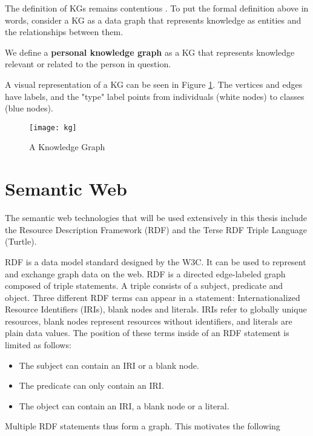 The definition of KGs remains contentious \cite{Hogan2021KG,commonsenseKG}. To put the formal definition above in words, consider a KG as a data graph that represents knowledge as entities and the relationships between them. 

We define a \textbf{personal knowledge graph} as a KG that represents knowledge relevant or related to the person in question.

A visual representation of a KG can be seen in Figure \ref{fig:kg}. The vertices and edges have labels, and the "type" label points from individuals (white nodes) to classes (blue nodes).

\begin{figure}[H]
    \centering
    \texttt{[image: kg]}
    \caption{A Knowledge Graph}
    \label{fig:kg}
\end{figure}







\section{Semantic Web}

The semantic web technologies that will be used extensively in this thesis include the Resource Description Framework (RDF) and the Terse RDF Triple Language (Turtle).

RDF is a data model standard designed by the W3C. It can be used to represent and exchange graph data on the web. RDF is a directed edge-labeled graph composed of triple statements. A triple consists of a subject, predicate and object. Three different RDF terms can appear in a statement: Internationalized Resource Identifiers (IRIs), blank nodes and literals. IRIs refer to globally unique resources, blank nodes represent resources without identifiers, and literals are plain data values. The position of these terms inside of an RDF statement is limited as follows:

\begin{itemize}
    \item The subject can contain an IRI or a blank node.
    \item The predicate can only contain an IRI.
    \item The object can contain an IRI, a blank node or a literal.
\end{itemize}

Multiple RDF statements thus form a graph. This motivates the following

